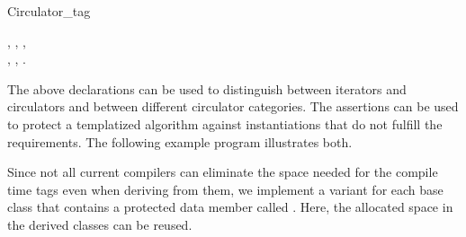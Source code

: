 \begin{ccRefClass}{Circulator_tag}
\ccSeeAlso

,
,
,\\
,
,
.

\ccExample

The above declarations can be used to distinguish between iterators
and circulators and between different circulator categories. The
assertions can be used to protect a templatized algorithm against
instantiations that do not fulfill the requirements. The following
example program illustrates both.


\ccImplementation

Since not all current compilers can eliminate the space needed for the
compile time tags even when deriving from them, we implement a variant
for each base class that contains a protected  data member
called . Here, the allocated space in the derived
classes can be reused.

\ccSetOneOfTwoColumns{8.4cm}
\ccGlue
{} 
\ccGlue
{}

\end{ccRefClass}
